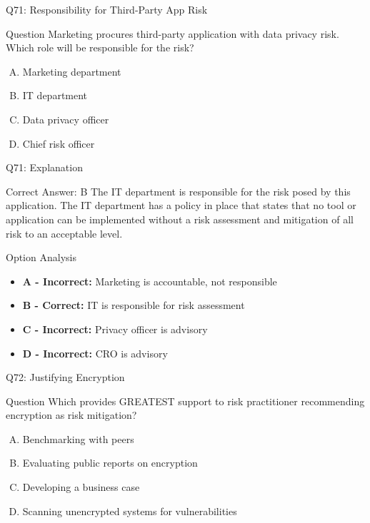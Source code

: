 \documentclass{beamer}
\begin{document}
	\begin{frame}{Q71: Responsibility for Third-Party App Risk}
		\begin{block}{Question}
			Marketing procures third-party application with data privacy risk. Which role will be responsible for the risk?
		\end{block}
		\begin{enumerate}[(A)]
			\item Marketing department
			\item IT department
			\item Data privacy officer
			\item Chief risk officer
		\end{enumerate}
	\end{frame}
	
	\begin{frame}{Q71: Explanation}
		\begin{block}{Correct Answer: B}
			The IT department is responsible for the risk posed by this application. The IT department has a policy in place that states that no tool or application can be implemented without a risk assessment and mitigation of all risk to an acceptable level.
		\end{block}
		\begin{block}{Option Analysis}
			\begin{itemize}
				\item \textbf{A - Incorrect:} Marketing is accountable, not responsible
				\item \textbf{B - Correct:} IT is responsible for risk assessment
				\item \textbf{C - Incorrect:} Privacy officer is advisory
				\item \textbf{D - Incorrect:} CRO is advisory
			\end{itemize}
		\end{block}
	\end{frame}
	
	\begin{frame}{Q72: Justifying Encryption}
		\begin{block}{Question}
			Which provides GREATEST support to risk practitioner recommending encryption as risk mitigation?
		\end{block}
		\begin{enumerate}[(A)]
			\item Benchmarking with peers
			\item Evaluating public reports on encryption
			\item Developing a business case
			\item Scanning unencrypted systems for vulnerabilities
		\end{enumerate}
	\end{frame}
	
\end{document}
